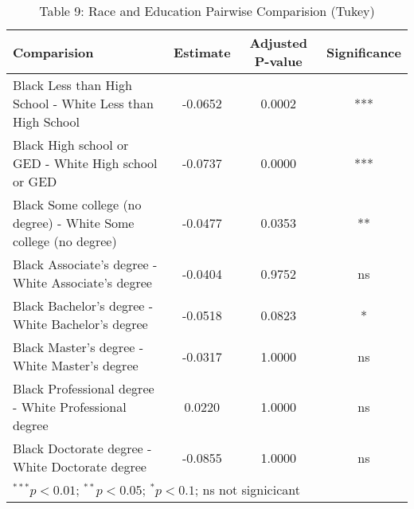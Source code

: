 \documentclass{article}
\begin{document}
\begin{table}[ht]
\centering
\caption*{Table 9: Race and Education Pairwise Comparision (Tukey)}
\begin{tabular}{lccc}
  \hline
 Comparision & Estimate & Adjusted P-value & Significance \\ 
  \hline
Black Less than High School - White Less than High School & -0.0652 & 0.0002 & *** \\ 
  Black High school or GED - White High school or GED & -0.0737 & 0.0000 & *** \\ 
  Black Some college (no degree) - White Some college (no degree) & -0.0477 & 0.0353 & ** \\ 
  Black Associate's degree - White Associate's degree & -0.0404 & 0.9752 & ns \\ 
  Black Bachelor's degree - White Bachelor's degree & -0.0518 & 0.0823 & * \\ 
  Black Master's degree - White Master's degree & -0.0317 & 1.0000 & ns \\ 
  Black Professional degree - White Professional degree & 0.0220 & 1.0000 & ns \\ 
  Black Doctorate degree - White Doctorate degree & -0.0855 & 1.0000 & ns \\ 
   \hline
   \multicolumn{4}{l}{\scriptsize{$^{***}p<0.01$; $^{**}p<0.05$; $^{*}p<0.1$; ns not signicicant}}
\end{tabular}
\end{table}
\end{document}
